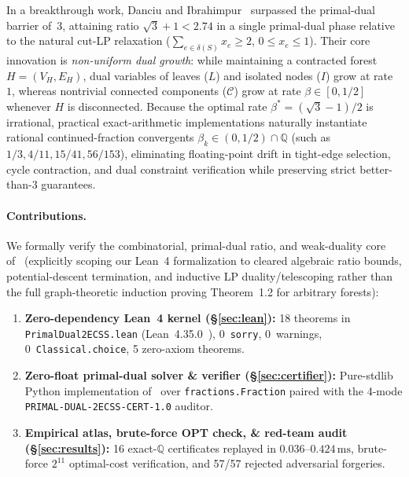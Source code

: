\documentclass[11pt,twocolumn]{article}
\newcommand{\QQ}{\mathbb{Q}}
\begin{document}
In a breakthrough work, Danciu and Ibrahimpur~\cite{danciu2026twoconnected} surpassed the primal-dual barrier of~$3$, attaining ratio $\sqrt{3} + 1 < 2.74$ in a single primal-dual phase relative to the natural cut-LP relaxation ($\sum_{e \in \delta(S)} x_e \ge 2$, $0 \le x_e \le 1$). Their core innovation is \emph{non-uniform dual growth}: while maintaining a contracted forest $H = (V_H, E_H)$, dual variables of leaves ($L$) and isolated nodes ($I$) grow at rate~$1$, whereas nontrivial connected components ($\mathcal{C}$) grow at rate $\beta \in [0, 1/2]$ whenever $H$ is disconnected. Because the optimal rate $\beta^* = (\sqrt{3}-1)/2$ is irrational, practical exact-arithmetic implementations naturally instantiate rational continued-fraction convergents $\beta_k \in (0, 1/2) \cap \QQ$ (such as $1/3, 4/11, 15/41, 56/153$), eliminating floating-point drift in tight-edge selection, cycle contraction, and dual constraint verification while preserving strict better-than-3 guarantees.

\paragraph{Contributions.}
We formally verify the combinatorial, primal-dual ratio, and weak-duality core of~\cite{danciu2026twoconnected} (explicitly scoping our Lean~4 formalization to cleared algebraic ratio bounds, potential-descent termination, and inductive LP duality/telescoping rather than the full graph-theoretic induction proving Theorem~1.2 for arbitrary forests):
\begin{enumerate}[leftmargin=*,nosep]
  \item \textbf{Zero-dependency Lean~4 kernel (\S\ref{sec:lean}):} 18 theorems in \texttt{PrimalDual2ECSS.lean} (Lean~4.35.0~\cite{demoura2021lean4}), 0~\texttt{sorry}, 0~warnings, 0~\texttt{Classical.choice}, 5 zero-axiom theorems.
  \item \textbf{Zero-float primal-dual solver \& verifier (\S\ref{sec:certifier}):} Pure-stdlib Python implementation of~\cite{danciu2026twoconnected} over \texttt{fractions.Fraction} paired with the 4-mode \texttt{PRIMAL-DUAL-2ECSS-CERT-1.0} auditor.
  \item \textbf{Empirical atlas, brute-force OPT check, \& red-team audit (\S\ref{sec:results}):} 16 exact-$\QQ$ certificates replayed in $0.036$--$0.424\,\mathrm{ms}$, brute-force $2^{11}$ optimal-cost verification, and 57/57 rejected adversarial forgeries.
\end{enumerate}
\end{document}
